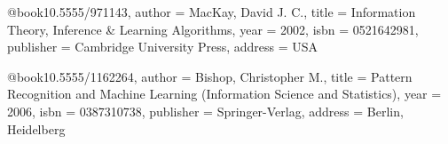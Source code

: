 @book{10.5555/971143,
author = {MacKay, David J. C.},
title = {Information Theory, Inference & Learning Algorithms},
year = {2002},
isbn = {0521642981},
publisher = {Cambridge University Press},
address = {USA}
}

@book{10.5555/1162264,
author = {Bishop, Christopher M.},
title = {Pattern Recognition and Machine Learning (Information Science and Statistics)},
year = {2006},
isbn = {0387310738},
publisher = {Springer-Verlag},
address = {Berlin, Heidelberg}
}